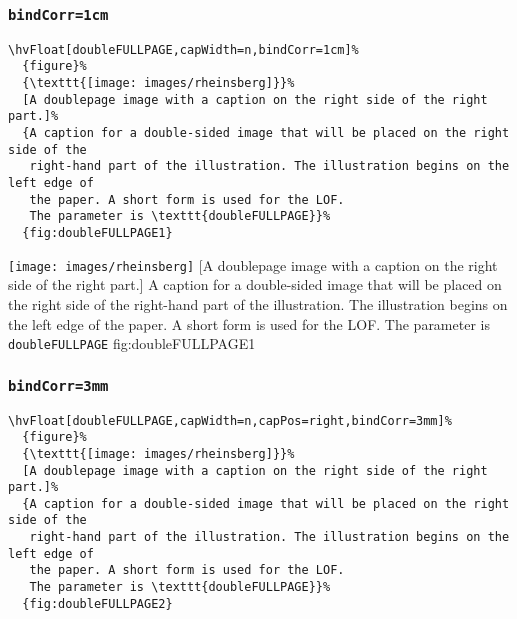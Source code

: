 \documentclass[twoside]{scrartcl}
\makeatletter
\let\hvBlindtext\Blindtext
\def\Blindtext{\par\color{black!40}\hvBlindtext\par\normalcolor}
\def\hvblindtext{\textcolor{black!40}{\blindtext@text}}
\makeatother
\begin{document}
\Blindtext

\hvblindtext

\hvblindtext


\subsubsection{\texttt{bindCorr=1cm}}

\begin{lstlisting}
\hvFloat[doubleFULLPAGE,capWidth=n,bindCorr=1cm]%
  {figure}%
  {\texttt{[image: images/rheinsberg]}}%
  [A doublepage image with a caption on the right side of the right part.]%
  {A caption for a double-sided image that will be placed on the right side of the
   right-hand part of the illustration. The illustration begins on the left edge of 
   the paper. A short form is used for the LOF. 
   The parameter is \texttt{doubleFULLPAGE}}%
  {fig:doubleFULLPAGE1}
\end{lstlisting}

%
  {\texttt{[image: images/rheinsberg]}}%
  [A doublepage image with a caption on the right side of the right part.]%
  {A caption for a double-sided image that will be placed on the right side of the
   right-hand part of the illustration. The illustration begins on the left edge of 
   the paper. A short form is used for the LOF. 
   The parameter is \texttt{doubleFULLPAGE}}%
  {fig:doubleFULLPAGE1}

\hvblindtext

\Blindtext

\Blindtext

\subsubsection{\texttt{bindCorr=3mm}}

\begin{lstlisting}
\hvFloat[doubleFULLPAGE,capWidth=n,capPos=right,bindCorr=3mm]%
  {figure}%
  {\texttt{[image: images/rheinsberg]}}%
  [A doublepage image with a caption on the right side of the right part.]%
  {A caption for a double-sided image that will be placed on the right side of the
   right-hand part of the illustration. The illustration begins on the left edge of 
   the paper. A short form is used for the LOF. 
   The parameter is \texttt{doubleFULLPAGE}}%
  {fig:doubleFULLPAGE2}
\end{lstlisting}
\end{document}
